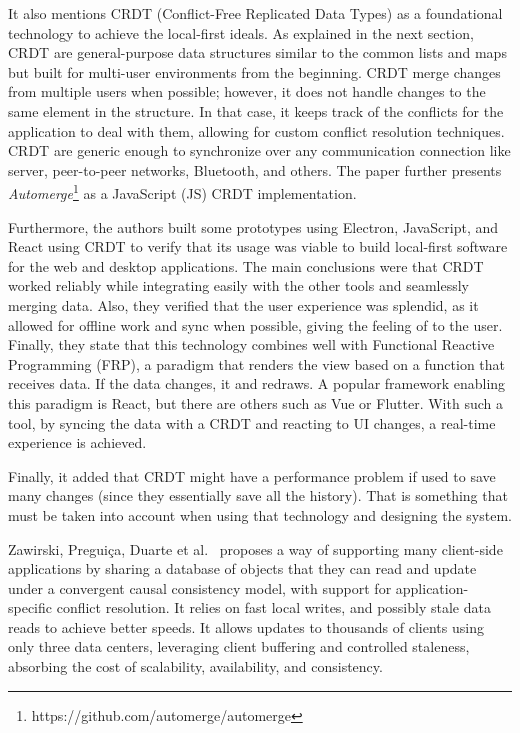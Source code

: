 It also mentions CRDT (Conflict-Free Replicated Data Types) as a foundational technology to achieve the local-first ideals. As explained in the next section,  CRDT are general-purpose data structures similar to the common lists and maps but built for multi-user environments from the beginning. CRDT merge changes from multiple users when possible; however, it does not handle changes to the same element in the structure. In that case, it keeps track of the conflicts for the application to deal with them, allowing for custom conflict resolution techniques. CRDT are generic enough to synchronize over any communication connection like server, peer-to-peer networks, Bluetooth, and others. The paper further presents \textit{Automerge}\footnote{https://github.com/automerge/automerge} as a JavaScript (JS) CRDT implementation.

Furthermore, the authors built some prototypes using Electron, JavaScript, and React using CRDT to verify that its usage was viable to build local-first software for the web and desktop applications. The main conclusions were that CRDT worked reliably while integrating easily with the other tools and seamlessly merging data. Also, they verified that the user experience was splendid, as it allowed for offline work and sync when possible, giving the feeling of  to the user. Finally, they state that this technology combines well with Functional Reactive Programming (FRP), a paradigm that renders the view based on a function that receives data. If the data changes, it  and redraws. A popular framework enabling this paradigm is React, but there are others such as Vue or Flutter. With such a tool, by syncing the data with a CRDT and reacting to UI changes, a real-time experience is achieved.

Finally, it added that CRDT might have a performance problem if used to save many changes (since they essentially save all the history). That is something that must be taken into account when using that technology and designing the system.

Zawirski, Preguiça, Duarte et al.\ \cite{Zawirski2015} proposes a way of supporting many client-side applications by sharing a database of objects that they can read and update under a convergent causal consistency model, with support for application-specific conflict resolution. It relies on fast local writes, and possibly stale data reads to achieve better speeds. It allows updates to thousands of clients using only three data centers, leveraging client buffering and controlled staleness, absorbing the cost of scalability, availability, and consistency.

